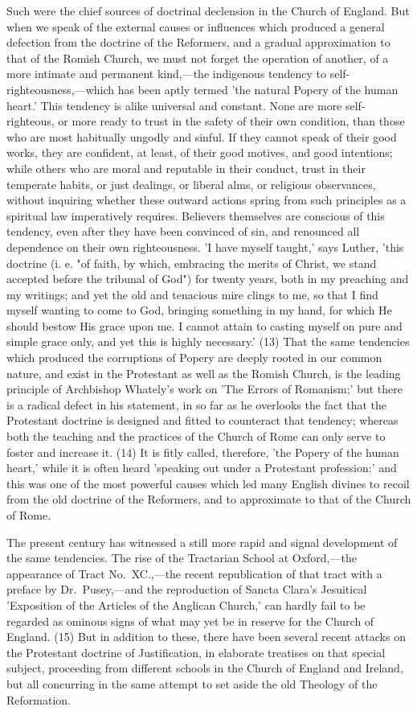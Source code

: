 \documentclass[
]{book}
\begin{document}
Such were the chief sources of doctrinal declension in the Church of England. But when we speak of the external causes or influences which produced a general defection from the doctrine of the Reformers, and a gradual approximation to that of the Romish Church, we must not forget the operation of another, of a more intimate and permanent kind,---the indigenous tendency to self-righteousness,---which has been aptly termed 'the natural Popery of the human heart.' This tendency is alike universal and constant. None are more self-righteous, or more ready to trust in the safety of their own condition, than those who are most habitually ungodly and sinful. If they cannot speak of their good works, they are confident, at least, of their good motives, and good intentions; while others who are moral and reputable in their conduct, trust in their temperate habits, or just dealings, or liberal alms, or religious observances, without inquiring whether these outward actions spring from such principles as a spiritual law imperatively requires. Believers themselves are conscious of this tendency, even after they have been convinced of sin, and renounced all dependence on their own righteousness. 'I have myself taught,' says Luther, 'this doctrine (i. e. "of faith, by which, embracing the merits of Christ, we stand accepted before the tribunal of God") for twenty years, both in my preaching and my writings; and yet the old and tenacious mire clings to me, so that I find myself wanting to come to God, bringing something in my hand, for which He should bestow His grace upon me. I cannot attain to casting myself on pure and simple grace only, and yet this is highly necessary.' (13) That the same tendencies which produced the corruptions of Popery are deeply rooted in our common nature, and exist in the Protestant as well as the Romish Church, is the leading principle of Archbishop Whately's work on 'The Errors of Romanism;' but there is a radical defect in his statement, in so far as he overlooks the fact that the Protestant doctrine is designed and fitted to counteract that tendency; whereas both the teaching and the practices of the Church of Rome can only serve to foster and increase it. (14) It is fitly called, therefore, 'the Popery of the human heart,' while it is often heard 'speaking out under a Protestant profession:' and this was one of the most powerful causes which led many English divines to recoil from the old doctrine of the Reformers, and to approximate to that of the Church of Rome.

The present century has witnessed a still more rapid and signal development of the same tendencies. The rise of the Tractarian School at Oxford,---the appearance of Tract No.~XC.,---the recent republication of that tract with a preface by Dr.~Pusey,---and the reproduction of Sancta Clara's Jesuitical 'Exposition of the Articles of the Anglican Church,' can hardly fail to be regarded as ominous signs of what may yet be in reserve for the Church of England. (15) But in addition to these, there have been several recent attacks on the Protestant doctrine of Justification, in elaborate treatises on that special subject, proceeding from different schools in the Church of England and Ireland, but all concurring in the same attempt to set aside the old Theology of the Reformation.
\end{document}
